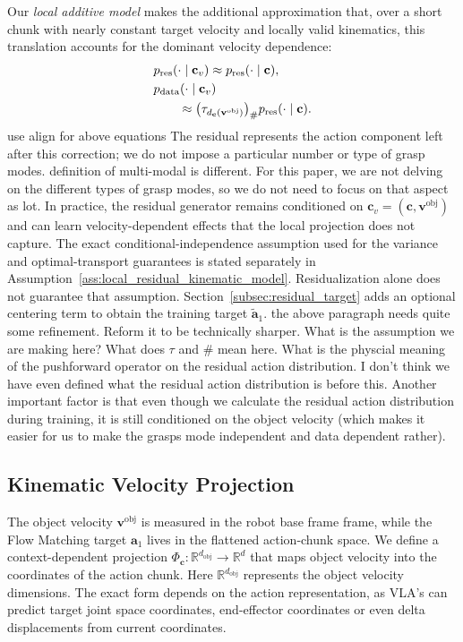 \documentclass[10pt,twocolumn,letterpaper]{article}
\newcommand{\EditAP}[1]{{\color{blue} #1}}
\begin{document}
Our \emph{local additive model} makes the additional approximation that,
over a short chunk with nearly constant target velocity and locally valid
kinematics, this translation accounts for the dominant velocity dependence:
\begin{align}
    &p_{\mathrm{res}}(\cdot\mid\mathbf c_v)
    \approx p_{\mathrm{res}}(\cdot\mid\mathbf c), \notag\\
    &p_{\mathrm{data}}(\cdot\mid\mathbf c_v) \notag\\
    &\qquad\approx\bigl(\tau_{d_{\mathbf c}(\mathbf v^{\mathrm{obj}})}\bigr)_{\#}
    p_{\mathrm{res}}(\cdot\mid\mathbf c).
    \label{eq:velocity_pushforward_model}
\end{align}
\EditAP{use align for above equations}
The residual represents the action component left after this correction;
we do not impose a particular number or type of grasp modes. \EditAP{definition of multi-modal is different. For this paper, we are not delving on the different types of grasp modes, so we do not need to focus on that aspect as lot.}
In practice, the residual generator remains conditioned on
$\mathbf c_v=(\mathbf c,\mathbf v^{\mathrm{obj}})$ and can learn
velocity-dependent effects that the local projection does not capture.
The exact conditional-independence assumption used for the variance and
optimal-transport guarantees is stated separately in
Assumption~\ref{ass:local_residual_kinematic_model}. Residualization alone
does not guarantee that assumption. Section~\ref{subsec:residual_target}
adds an optional centering term to obtain the training target
$\widetilde{\mathbf a}_1$.
\EditAP{the above paragraph needs quite some refinement. Reform it to be technically sharper. What is the assumption we are making here? What does $\tau$ and $\#$ mean here. What is the physcial meaning of the pushforward operator on the residual action distribution. I don't think we have even defined what the residual action distribution is before this. Another important factor is that even though we calculate the residual action distribution during training, it is still conditioned on the object velocity (which makes it easier for us to make the grasps mode independent and data dependent rather).}

\subsection{Kinematic Velocity Projection}
\label{subsec:kinematic_projection}

The object velocity $\mathbf v^{\mathrm{obj}}$ is measured in the robot base frame
frame, while the Flow Matching target $\mathbf a_1$ lives in the flattened
action-chunk space. We define a context-dependent projection
$\Phi_{\mathbf c}:\mathbb R^{d_\text{obj}}\rightarrow\mathbb R^d$ that maps object
velocity into the coordinates of the action chunk. Here $\mathbb R^{d_\text{obj}}$ represents the object velocity dimensions. The exact form depends on the
action representation, as VLA's can predict target joint space coordinates, end-effector coordinates or even delta displacements from current coordinates.
\end{document}
